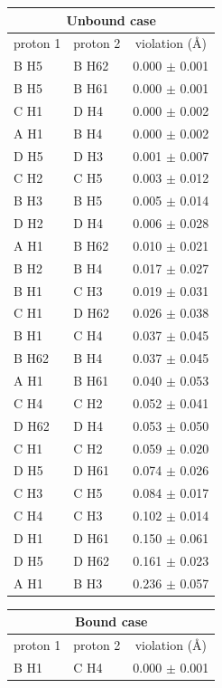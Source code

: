 \begin{table}
\footnotesize
\renewcommand{\arraystretch}{1.3}
\begin{tabular}{llc}
\multicolumn{3}{c}{Unbound case} \\
\midrule
proton 1  & proton 2 & violation (\si{\angstrom}) \\
\midrule
B H5 & B H62 & 0.000 $\pm$ 0.001 \\
B H5 & B H61 & 0.000 $\pm$ 0.001 \\
C H1 & D H4 & 0.000 $\pm$ 0.002 \\
A H1 & B H4 & 0.000 $\pm$ 0.002 \\
D H5 & D H3 & 0.001 $\pm$ 0.007 \\
C H2 & C H5 & 0.003 $\pm$ 0.012 \\
B H3 & B H5 & 0.005 $\pm$ 0.014 \\
D H2 & D H4 & 0.006 $\pm$ 0.028 \\
A H1 & B H62 & 0.010 $\pm$ 0.021 \\
B H2 & B H4 & 0.017 $\pm$ 0.027 \\
B H1 & C H3 & 0.019 $\pm$ 0.031 \\
C H1 & D H62 & 0.026 $\pm$ 0.038 \\
B H1 & C H4 & 0.037 $\pm$ 0.045 \\
B H62 & B H4 & 0.037 $\pm$ 0.045 \\
A H1 & B H61 & 0.040 $\pm$ 0.053 \\
C H4 & C H2 & 0.052 $\pm$ 0.041 \\
D H62 & D H4 & 0.053 $\pm$ 0.050 \\
C H1 & C H2 & 0.059 $\pm$ 0.020 \\
D H5 & D H61 & 0.074 $\pm$ 0.026 \\
C H3 & C H5 & 0.084 $\pm$ 0.017 \\
C H4 & C H3 & 0.102 $\pm$ 0.014 \\
D H1 & D H61 & 0.150 $\pm$ 0.061 \\
D H5 & D H62 & 0.161 $\pm$ 0.023 \\
A H1 & B H3 & 0.236 $\pm$ 0.057 \\
\midrule
\end{tabular}
\quad
\begin{tabular}{llc}
\multicolumn{3}{c}{Bound case} \\
\midrule
proton 1  & proton 2 & violation (\si{\angstrom}) \\
\midrule
B H1 & C H4 & 0.000 $\pm$ 0.001 \\

\end{tabular}
\end{table}
